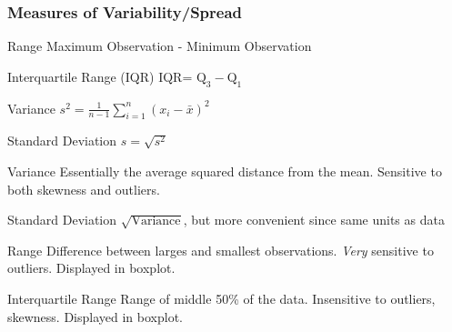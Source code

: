 \documentclass[handout]{beamer}
\begin{document}
\begin{frame}
\frametitle{Measures of Variability/Spread}

\begin{block}{Range}
Maximum Observation - Minimum Observation
\end{block}
\pause
\begin{block}{Interquartile Range (IQR)}
IQR= $\mbox{Q}_3 - \mbox{Q}_1$
\end{block}
\pause
\begin{block}{Variance}
$\displaystyle s^2 = \frac{1}{n-1} \sum_{i=1}^n (x_i - \bar{x})^2$
\end{block}
\pause
 \begin{block}{Standard Deviation}
	$s = \sqrt{s^2}$
\end{block}
\end{frame}

\begin{frame}
\begin{block}{Variance}
Essentially the average squared distance from the mean. Sensitive to both skewness and outliers.
\end{block}
\pause
\begin{block}{Standard Deviation}
$\sqrt{\mbox{Variance}}$, but more convenient since \alert{same units as data}
\end{block}
\pause
\begin{block}{Range}
Difference between larges and smallest observations. \emph{Very} sensitive to outliers. Displayed in boxplot.
\end{block}
\pause
\begin{block}{Interquartile Range}
Range of middle 50\% of the data. Insensitive to outliers, skewness. Displayed in boxplot.
\end{block}

\end{frame}



\end{document}
